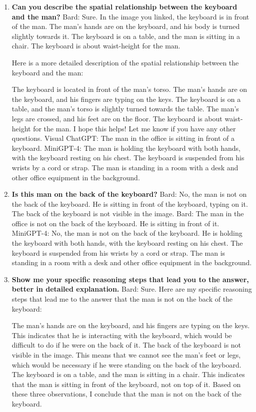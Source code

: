     \begin{enumerate}
        \item \textbf{Can you describe the spatial relationship between the keyboard and the man?}
        \subitem Bard: 
        Sure. In the image you linked, the keyboard is in front of the man. The man's hands are on the keyboard, and his body is turned slightly towards it. The keyboard is on a table, and the man is sitting in a chair. The keyboard is about waist-height for the man.

        Here is a more detailed description of the spatial relationship between the keyboard and the man:

        The keyboard is located in front of the man's torso.
        The man's hands are on the keyboard, and his fingers are typing on the keys.
        The keyboard is on a table, and the man's torso is slightly turned towards the table.
        The man's legs are crossed, and his feet are on the floor.
        The keyboard is about waist-height for the man.
        I hope this helps! Let me know if you have any other questions.
        \subitem Visual ChatGPT: The man in the office is sitting in front of a keyboard.
        \subitem MiniGPT-4: The man is holding the keyboard with both hands, with the keyboard resting on his chest. The keyboard is suspended from his wrists by a cord or strap. The man is standing in a room with a desk and other office equipment in the background.
        \item \textbf{Is this man on the back of the keyboard?}
        \subitem Bard: 
        No, the man is not on the back of the keyboard. He is sitting in front of the keyboard, typing on it. The back of the keyboard is not visible in the image.
        \subitem Bard: The man in the office is not on the back of the keyboard. He is sitting in front of it.
        \subitem MiniGPT-4: No, the man is not on the back of the keyboard. He is holding the keyboard with both hands, with the keyboard resting on his chest. The keyboard is suspended from his wrists by a cord or strap. The man is standing in a room with a desk and other office equipment in the background.
        \item \textbf{Show me your specific reasoning steps that lead you to the answer, better in detailed explanation.}
        \subitem Bard: 
        Sure. Here are my specific reasoning steps that lead me to the answer that the man is not on the back of the keyboard:
        
        The man's hands are on the keyboard, and his fingers are typing on the keys. This indicates that he is interacting with the keyboard, which would be difficult to do if he were on the back of it.
        The back of the keyboard is not visible in the image. This means that we cannot see the man's feet or legs, which would be necessary if he were standing on the back of the keyboard.
        The keyboard is on a table, and the man is sitting in a chair. This indicates that the man is sitting in front of the keyboard, not on top of it.
        Based on these three observations, I conclude that the man is not on the back of the keyboard.
        

\end{enumerate}
